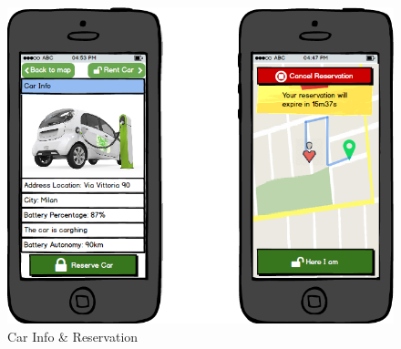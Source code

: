 \documentclass[english]{article}
\begin{document}
				\begin{figure}[H]
					\centering
					\includegraphics[scale=0.4]{./Mockups/powerEnjoyUser/carInfo+reservation.png}%
					\caption{Car Info \& Reservation}
				\end{figure}
\end{document}
